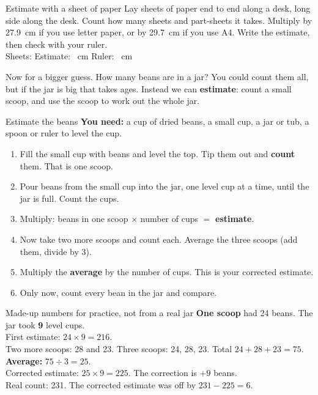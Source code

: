 \begin{tryit}{Estimate with a sheet of paper}
Lay sheets of paper end to end along a desk, long side along the desk. Count how many sheets and part-sheets it takes. Multiply by 27.9~cm if you use letter paper, or by 29.7~cm if you use A4. Write the estimate, then check with your ruler.\\[4pt]
Sheets: \wline[1.6cm] \quad Estimate: \wline[1.6cm]~cm \quad Ruler: \wline[1.6cm]~cm
\end{tryit}

Now for a bigger guess. How many beans are in a jar? You could count them all, but if the jar is big that takes ages. Instead we can \textbf{estimate}: count a small scoop, and use the scoop to work out the whole jar.

\begin{tryit}{Estimate the beans}
\textbf{You need:} a cup of dried beans, a small cup, a jar or tub, a spoon or ruler to level the cup.
\begin{enumerate}[leftmargin=1.6em]
\item Fill the small cup with beans and level the top. Tip them out and \textbf{count} them. That is one scoop.
\item Pour beans from the small cup into the jar, one level cup at a time, until the jar is full. Count the cups.
\item Multiply: beans in one scoop $\times$ number of cups $=$ \textbf{estimate}.
\item Now take two more scoops and count each. Average the three scoops (add them, divide by 3).
\item Multiply the \textbf{average} by the number of cups. This is your corrected estimate.
\item Only now, count every bean in the jar and compare.
\end{enumerate}
\end{tryit}

\begin{worked}{Made-up numbers for practice, not from a real jar}
\textbf{One scoop} had 24 beans. The jar took \textbf{9} level cups.\\
First estimate: $24\times9=216$.\\
Two more scoops: 28 and 23. Three scoops: 24, 28, 23. Total $24+28+23=75$. \textbf{Average:} $75\div3=25$.\\
Corrected estimate: $25\times9=225$. The correction is $+9$ beans.\\
Real count: 231. The corrected estimate was off by $231-225=6$.
\end{worked}

